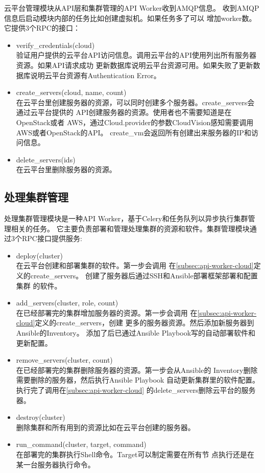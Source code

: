 云平台管理模块从API层和集群管理的API Worker收到AMQP信息。
收到AMQP信息后启动模块内部的任务比如创建虚拟机。如果任务多了可以
增加worker数。它提供3个RPC的接口：
\begin{itemize}
  \item verify\_credentials(cloud) \\
        验证用户提供的云平台API访问信息。调用云平台的API使用列出所有服务器资源。如果API请求成功
        更新数据库说明云平台资源可用。如果失败了更新数据库说明云平台资源有Authentication Error。
  \item create\_servers(cloud, name, count) \\
        在云平台里创建服务器的资源，可以同时创建多个服务器。create\_servers会通过云平台提供的
        API创建服务器的资源。使用者也不需要知道是在OpenStack或者
        AWS，通过Cloud.provider的参数CloudVision感知需要调用AWS或者OpenStack的API。
        create\_vm会返回所有创建出来服务器的IP和访问信息。
  \item delete\_servers(ids) \\
        在云平台里删除服务器的资源。
\end{itemize}

\subsection{处理集群管理}
\label{subsec:api-worker-cluster}
处理集群管理模块是一种API Worker，基于Celery和任务队列以异步执行集群管理相关的任务。
它主要负责部署和管理处理集群的资源和软件。集群管理模块通过3个RPC接口提供服务:
\begin{itemize}
  \item deploy(cluster) \\
        在云平台创建和部署集群的软件。第一步会调用
        在\ref{subsec:api-worker-cloud}定义的create\_servers。
        创建了服务器后通过SSH和Ansible部署框架部署和配置集群
        的软件。
  \item add\_servers(cluster, role, count) \\
        在已经部署完的集群增加服务器的资源。第一步会调用
        在\ref{subsec:api-worker-cloud}定义的create\_servers，创建
        更多的服务器资源。然后添加新服务器到Ansible的Inventory。
        添加了后已通过Ansible Playbook写的自动部署软件和更新配置。
  \item remove\_servers(cluster, count) \\
        在已经部署完的集群删除服务器的资源。第一步会从Ansible的
        Inventory删除需要删除的服务器，然后执行Ansible Playbook
        自动更新集群里的软件配置。执行完了调用在\ref{subsec:api-worker-cloud}
        的delete\_servers删除云平台的服务器。
  \item destroy(cluster) \\
        删除集群和所有用到的资源比如在云平台创建的服务器。
  \item run\_command(cluster, target, command) \\
        在部署完的集群执行Shell命令。Target可以制定需要在所有节
        点执行还是在某一台服务器执行命令。
\end{itemize}

